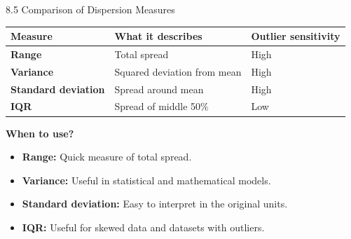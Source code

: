 
\begin{frame}{8.5 Comparison of Dispersion Measures}

\small

\begin{table}
\centering

\begin{tabular}{>{\bfseries}l l l}
\toprule
Measure & What it describes & Outlier sensitivity \\
\midrule
Range & Total spread & High \\
Variance & Squared deviation from mean & High \\
Standard deviation & Spread around mean & High \\
IQR & Spread of middle 50\% & Low \\
\bottomrule
\end{tabular}

\end{table}

\vspace{0.4cm}

\textbf{When to use?}

\begin{itemize}
    \item \textbf{Range:} Quick measure of total spread.
    \item \textbf{Variance:} Useful in statistical and mathematical models.
    \item \textbf{Standard deviation:} Easy to interpret in the original units.
    \item \textbf{IQR:} Useful for skewed data and datasets with outliers.
\end{itemize}

\end{frame}